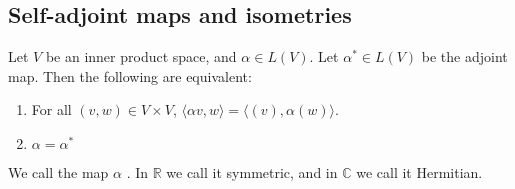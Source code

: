 \documentclass[egregdoesnotlikesansseriftitles,a4paper]{scrartcl}
\begin{document}
\subsection{Self-adjoint maps and isometries}

\begin{proposition}
      Let $V$ be an inner product space, and $\alpha \in L (V)$. Let $\alpha^* \in L (V)$ be the adjoint map. Then the following are equivalent:
      \begin{enumerate}
           \item For all $(v,w) \in V \times V$, $\langle \alpha v,w \rangle =\langle (v),\alpha (w) \rangle $.
           \item $\alpha=\alpha^*$
      \end{enumerate}
      We call the map $\alpha$ . In $\mathbb{R}$ we call it symmetric, and in $\mathbb{C}$ we call it Hermitian.   
\end{proposition}
\end{document}
